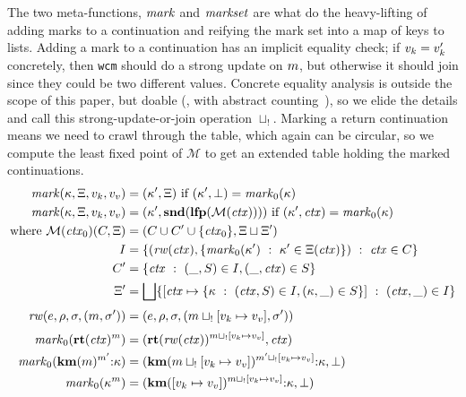 {The two meta-functions, $\mathit{mark}$ and $\mathit{markset}$ are what do the heavy-lifting of adding marks to a continuation and reifying the mark set into a map of keys to lists.
%
Adding a mark to a continuation has an implicit equality check; if $v_k = v_k'$ concretely, then {\tt wcm} should do a strong update on $m$, but otherwise it should join since they could be two different values.
%
Concrete equality analysis is outside the scope of this paper, but doable (\eg, with abstract counting~\citep{dvanhorn:Might:2006:GammaCFA}), so we elide the details and call this strong-update-or-join operation $\sqcup_{!{}}$.
%
Marking a return continuation means we need to crawl through the table, which again can be circular, so we compute the least fixed point of ${\mathcal M}$ to get an extended table holding the marked continuations.
%
\newcommand{\rewritectx}{\mathit{rw}}
\newcommand{\domarkstep}{\mathit{mark}_0}
\begin{align*}
  \domark(\mkont, \mktab, \mval_k, \mval_v) &= (\mkont', \mktab) \text{ if } (\mkont',\bot) = \domarkstep(\mkont) \\
  \domark(\mkont, \mktab, \mval_k, \mval_v) &= (\mkont', \mathbf{snd}(\lfp({\mathcal M}(\mctx)))) \text{ if } (\mkont',\mctx) = \domarkstep(\mkont) \\
  \text{where } {\mathcal M}(\mctx_0)(C, \mktab) &= (C \cup C' \cup \set{\mctx_0}, \mktab \sqcup \mktab') \\
    I &= \setbuild{(\rewritectx(\mctx), \setbuild{\domarkstep(\mkont')}{\mkont' \in \mktab(\mctx)})}{\mctx \in C} \\
    C' &= \setbuild{\mctx}{(\_, S) \in I, (\_, \mctx) \in S} \\
    \mktab' &= \bigsqcup\setbuild{[\mctx \mapsto \setbuild{\mkont}{(\mctx, S) \in I, (\mkont, \_) \in S}]}{(\mctx,\_) \in I}
\\[2pt]
  \rewritectx(\mexpr,\menv,\mstore,(\mmarks, \mstore')) &= (\mexpr,\menv,\mstore,(\mmarks\sqcup_{!{}}[\mval_k \mapsto \mval_v], \mstore'))
\\[2pt]
  \domarkstep(\krt{\mctx}^\mmarks) &= (\krt{\rewritectx(\mctx)}^{\mmarks \sqcup_{!{}} [\mval_k \mapsto \mval_v]}, \mctx) \\
  \domarkstep(\kcons{\kwcm{\mmarks}^{\mmarks'}}{\mkont}) &= (\kcons{\kwcm{\mmarks \sqcup_{!{}} [\mval_k \mapsto \mval_v]}^{\mmarks' \sqcup_{!{}} [\mval_k \mapsto \mval_v]}}{\mkont}, \bot) \\
  \domarkstep(\mkont^\mmarks) &= (\kcons{\kwcm{[\mval_k \mapsto \mval_v]}^{\mmarks \sqcup_{!{}} [\mval_k \mapsto \mval_v]}}{\mkont}, \bot)
\end{align*}

}
